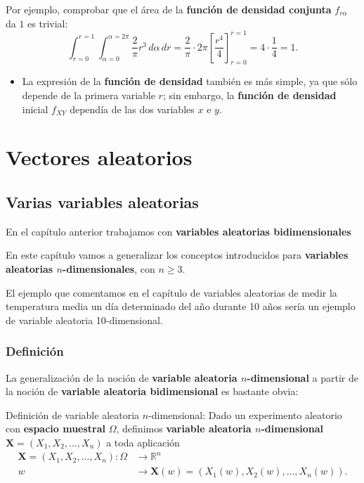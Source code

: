 \documentclass[]{book}
\providecommand{\tightlist}{%
  \setlength{\itemsep}{0pt}\setlength{\parskip}{0pt}}
\begin{document}
Por ejemplo, comprobar que el área de la \textbf{función de densidad conjunta} \(f_{r\alpha}\) da \(1\) es trivial:
\[
\int_{r=0}^{r=1}\int_{\alpha =0}^{\alpha =2\pi}\frac{2}{\pi} r^3\, d\alpha\, dr = \frac{2}{\pi}\cdot 2\pi \left[\frac{r^4}{4}\right]_{r=0}^{r=1}=4\cdot \frac{1}{4}=1.
\]

\begin{itemize}
\tightlist
\item
  La expresión de la \textbf{función de densidad} también es más simple, ya que sólo depende de la primera variable \(r\); sin embargo, la \textbf{función de densidad} inicial \(f_{XY}\) dependía de las dos variables \(x\) e \(y\).
\end{itemize}

\hypertarget{vectores-aleatorios}{%
\chapter{Vectores aleatorios}\label{vectores-aleatorios}}

\hypertarget{varias-variables-aleatorias}{%
\section{Varias variables aleatorias}\label{varias-variables-aleatorias}}

En el capítulo anterior trabajamos con \textbf{variables aleatorias bidimensionales}

En este capítulo vamos a generalizar los conceptos introducidos para \textbf{variables aleatorias \(n\)-dimensionales}, con \(n\geq 3\).

El ejemplo que comentamos en el capítulo de variables aleatorias de medir la temperatura media un día determinado del año durante 10 años sería un ejemplo de variable aleatoria 10-dimensional.

\hypertarget{definiciuxf3n-3}{%
\subsection{Definición}\label{definiciuxf3n-3}}

La generalización de la noción de \textbf{variable aleatoria \(n\)-dimensional} a partir de la noción de \textbf{variable aleatoria bidimensional} es bastante obvia:

Definición de variable aleatoria \(n\)-dimensional:
Dado un experimento aleatorio con \textbf{espacio muestral} \(\Omega\), definimos \textbf{variable aleatoria \(n\)-dimensional} \(\mathbf{X}=(X_1,X_2,\ldots,X_n)\) a toda aplicación
\[
\begin{array}{rl}
\mathbf{X}=(X_1,X_2,\ldots,X_n): \Omega & \longrightarrow \mathbb{R}^n\\
w & \longrightarrow \mathbf{X}(w)=(X_1(w),X_2(w),\ldots,X_n(w)).
\end{array}
\]
\end{document}
